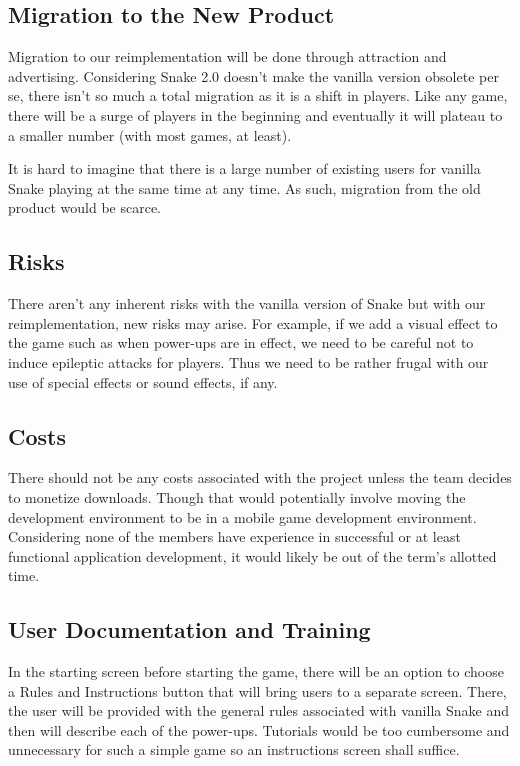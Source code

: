 \documentclass[12pt, titlepage]{article}
\begin{document}
\subsection{Migration to the New Product}
Migration to our reimplementation will be done through attraction and advertising. Considering Snake 2.0 doesn't make the vanilla version obsolete per se, there isn't so much a total migration as it is a shift in players. Like any game, there will be a surge of players in the beginning and eventually it will plateau to a smaller number (with most games, at least). 

It is hard to imagine that there is a large number of existing users for vanilla Snake playing at the same time at any time. As such, migration from the old product would be scarce. 

\subsection{Risks}
There aren't any inherent risks with the vanilla version of Snake but with our reimplementation, new risks may arise. For example, if we add a visual effect to the game such as when power-ups are in effect, we need to be careful not to induce epileptic attacks for players. Thus we need to be rather frugal with our use of special effects or sound effects, if any. 

\subsection{Costs}
There should not be any costs associated with the project unless the team decides to monetize downloads. Though that would potentially involve moving the development environment to be in a mobile game development environment. Considering none of the members have experience in successful or at least functional application development, it would likely be out of the term's allotted time. 

\subsection{User Documentation and Training}
In the starting screen before starting the game, there will be an option to choose a Rules and Instructions button that will bring users to a separate screen. There, the user will be provided with the general rules associated with vanilla Snake and then will describe each of the power-ups. Tutorials would be too cumbersome and unnecessary for such a simple game so an instructions screen shall suffice.
\end{document}
